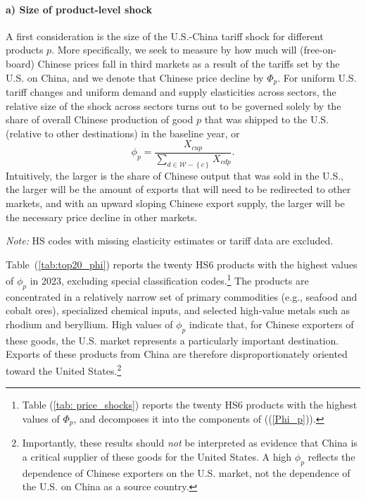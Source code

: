\documentclass[english,12pt]{article}
\theoremstyle{definition}
\let\oldref\ref
\renewcommand{\ref}[1]{(\oldref{#1})}
\begin{document}
\paragraph{a) Size of product-level shock}
A first consideration is the size of the U.S.-China tariff shock for 
different products $p$. More specifically, we seek to measure by how much will 
(free-on-board) Chinese prices fall in third markets as a result of the tariffs
set by the U.S. on China, and we denote that Chinese price decline by $\Phi _{p}$. For 
uniform U.S. tariff changes and uniform demand and supply elasticities
across sectors, the relative size of the shock across sectors turns out to be 
governed solely by the share of overall Chinese production of good $p$ that was 
shipped to the U.S. (relative to other destinations) in the baseline year, or%
\begin{equation}
\phi _{p}=\frac{X_{cup}}{\sum\nolimits_{d\in \mathcal{W-}\left\{ c\right\}
}X_{cdp}}.  \label{eq: Relative Shock}
\end{equation}%
Intuitively, the larger is the share of Chinese output that was sold in the
U.S., the larger will be the amount of exports that will need to be redirected
to other markets, and with an upward sloping Chinese export supply, the larger 
will be the necessary price decline in other markets.

\begin{table}[htbp]
\centering
\small
\hspace*{-0.5cm}

\caption{Top 20 HS6 Products by $\phi_{p}$}
\label{tab:top20_phi}

\vspace{0.5em}

\begin{minipage}{.98\textwidth}
\footnotesize 
\textit{Note:} HS codes with missing elasticity estimates or tariff data are excluded. 
\end{minipage}
\end{table}

Table~\ref{tab:top20_phi} reports the twenty HS6 products with the highest values of $\phi _{p}$ in 2023, excluding special classification codes.\footnote{Table \ref{tab: price_shocks} reports the twenty HS6 products with the highest values of $\Phi_{p}$, and decomposes it into the components of (\ref{Phi_p}).} The products are concentrated in a relatively narrow set of primary commodities (e.g., seafood and cobalt ores), specialized chemical inputs, and selected high-value metals such as rhodium and beryllium. High values of $\phi_{p}$ indicate that, for Chinese exporters of these goods, the U.S. market represents a particularly important destination. Exports of these products from China are therefore disproportionately oriented toward the United States.\footnote{Importantly, these results should \emph{not} be interpreted as evidence that China is a critical supplier of these goods for the United States. A high $\phi _{p}$ reflects the dependence of Chinese exporters on the U.S. market, not the dependence of the U.S. on China as a source country.}
\end{document}
